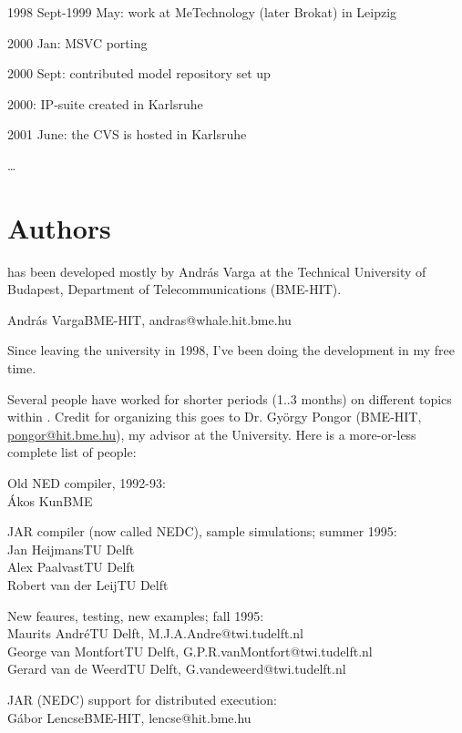 1998 Sept-1999 May: work at MeTechnology (later Brokat) in Leipzig

2000 Jan: MSVC porting

2000 Sept: contributed model repository set up

2000: IP-suite created in Karlsruhe

2001 June: the CVS is hosted in Karlsruhe

\dots





\section{Authors}

{\opp} has been developed mostly by Andr\'{a}s Varga at the Technical
University of Budapest, Department of Telecommunications (BME-HIT).

\tab Andr\'{a}s Varga\tab \tab BME-HIT, andras@whale.hit.bme.hu


Since leaving the university in 1998, I've been doing the development
in my free time.

Several people have worked for shorter periods (1..3 months)
on different topics within {\opp}. Credit for organizing this
goes to Dr. Gy\"{o}rgy Pongor (BME-HIT, \href{mailto:pongor@hit.bme.hu}{pongor@hit.bme.hu}), my
advisor at the University. Here is a more-or-less complete list
of people:

Old NED compiler, 1992-93:\\
\tab \'{A}kos Kun\tab \tab BME

JAR compiler (now called NEDC), sample simulations; summer 1995:\\
\tab Jan Heijmans\tab \tab TU Delft\\
\tab Alex Paalvast\tab \tab TU Delft\\
\tab Robert van der Leij\tab TU Delft

New feaures, testing, new examples; fall 1995:\\
\tab Maurits Andr\'{e}\tab \tab TU Delft, M.J.A.Andre@twi.tudelft.nl\\
\tab George van Montfort\tab TU Delft, G.P.R.vanMontfort@twi.tudelft.nl\\
\tab Gerard van de Weerd\tab TU Delft, G.vandeweerd@twi.tudelft.nl

JAR (NEDC) support for distributed execution:\\
\tab G\'{a}bor Lencse\tab \tab BME-HIT, lencse@hit.bme.hu

